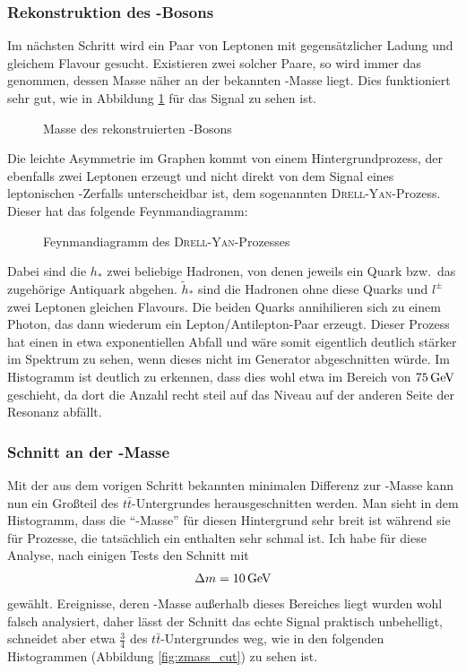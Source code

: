 \subsubsection{Rekonstruktion des \Z-Bosons}
Im nächsten Schritt wird ein Paar von Leptonen mit gegensätzlicher Ladung und
gleichem Flavour gesucht. Existieren zwei solcher Paare, so wird immer das
genommen, dessen Masse näher an der bekannten \Z-Masse liegt. Dies funktioniert
sehr gut, wie in Abbildung \ref{fig:signal_zmasse} für das Signal zu sehen ist.
\begin{figure}[h]
  \begin{center}
    
  \end{center}
  \caption{Masse des rekonstruierten \Z-Bosons}
  \label{fig:signal_zmasse}
\end{figure}

Die leichte Asymmetrie im Graphen kommt von einem Hintergrundprozess, der
ebenfalls zwei Leptonen erzeugt und nicht direkt von dem Signal eines
leptonischen \Z-Zerfalls unterscheidbar ist, dem sogenannten
\textsc{Drell}-\textsc{Yan}-Prozess. Dieser hat das folgende Feynmandiagramm:
\begin{figure}[h!]
  \begin{center}
    
  \end{center}
  \caption{Feynmandiagramm des \textsc{Drell}-\textsc{Yan}-Prozesses}
  \label{fig:drellyan}
\end{figure}
Dabei sind die $h_*$ zwei beliebige Hadronen, von denen jeweils ein Quark bzw.\
das zugehörige Antiquark abgehen. $\tilde{h}_*$ sind die Hadronen ohne diese
Quarks und $l^\pm$ zwei Leptonen gleichen Flavours. Die beiden Quarks
annihilieren sich zu einem Photon, das dann wiederum ein Lepton/Antilepton-Paar
erzeugt. Dieser Prozess hat einen in etwa exponentiellen Abfall und wäre somit
eigentlich deutlich stärker im Spektrum zu sehen, wenn dieses nicht im Generator
abgeschnitten würde. Im Histogramm ist deutlich zu erkennen, dass dies wohl etwa
im Bereich von $\unit[75]{GeV}$ geschieht, da dort die Anzahl recht steil auf
das Niveau auf der anderen Seite der Resonanz abfällt.

\subsubsection{Schnitt an der \Z-Masse}
Mit der aus dem vorigen Schritt bekannten minimalen Differenz zur \Z-Masse kann
nun ein Großteil des $t\bar{t}$-Untergrundes herausgeschnitten werden. Man sieht
in dem Histogramm, dass die "`\Z-Masse"' für diesen Hintergrund sehr breit ist
während sie für Prozesse, die tatsächlich ein \Z enthalten sehr schmal ist. Ich
habe für diese Analyse, nach einigen Tests den Schnitt mit
\begin{align}
  \Delta m = \unit[10]{GeV}
\end{align}
gewählt. Ereignisse, deren
\Z-Masse außerhalb dieses Bereiches liegt wurden wohl falsch analysiert, daher
lässt der Schnitt das echte Signal praktisch unbehelligt, schneidet aber etwa
$\frac{3}{4}$ des $t\bar{t}$-Untergrundes weg, wie in den folgenden Histogrammen
(Abbildung \ref{fig:zmass_cut}) zu sehen ist.

